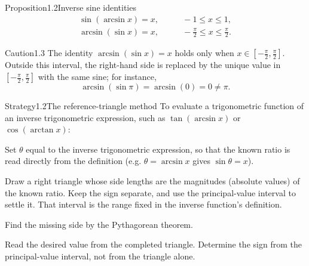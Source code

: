 \documentclass[a4paper,12pt,oneside]{memoir}
\begin{document}
\begin{envproposition}{Proposition}{1.2}{Inverse sine identities}
\[ \begin{aligned} \sin(\arcsin x) = x, &\qquad -1 \le x \le 1,\\ \arcsin(\sin x) = x, &\qquad -\tfrac{\pi}{2} \le x \le \tfrac{\pi}{2}. \end{aligned} \]
\end{envproposition}
\begin{envcaution}{Caution}{1.3}{}
The identity \(\arcsin(\sin x) = x\) holds only when \(x \in \left[-\tfrac{\pi}{2}, \tfrac{\pi}{2}\right]\). Outside this interval, the right-hand side is replaced by the unique value in \(\left[-\tfrac{\pi}{2}, \tfrac{\pi}{2}\right]\) with the same sine; for instance, \[ \arcsin(\sin \pi) = \arcsin(0) = 0 \neq \pi. \]
\end{envcaution}
\begin{envstrategy}{Strategy}{1.2}{The reference-triangle method}
To evaluate a trigonometric function of an inverse trigonometric expression, such as \(\tan(\arcsin x)\) or \(\cos(\arctan x)\):

\begin{steps}
  \item Set \(\theta\) equal to the inverse trigonometric expression, so that the known ratio is read directly from the definition (e.g. \(\theta = \arcsin x\) gives \(\sin\theta = x\)).
  \item Draw a right triangle whose side lengths are the magnitudes (absolute values) of the known ratio. Keep the sign separate, and use the principal-value interval to settle it. That interval is the range fixed in the inverse function’s definition.
  \item Find the missing side by the Pythagorean theorem.
  \item Read the desired value from the completed triangle. Determine the sign from the principal-value interval, not from the triangle alone.
\end{steps}
\end{envstrategy}
\end{document}
